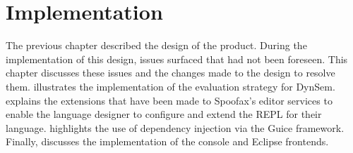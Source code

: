 \chapter{Implementation}
\label{cha:implementation}

The previous chapter described the design of the product. During the
implementation of this design, issues surfaced that had not been foreseen. This
chapter discusses these issues and the changes made to the design to resolve
them.  illustrates the implementation of the
evaluation strategy for DynSem.  explains the
extensions that have been made to Spoofax's editor services to enable the
language designer to configure and extend the REPL for their language.
 highlights the use of dependency injection via the Guice
framework. Finally,  discusses the implementation of the
console and Eclipse frontends.









